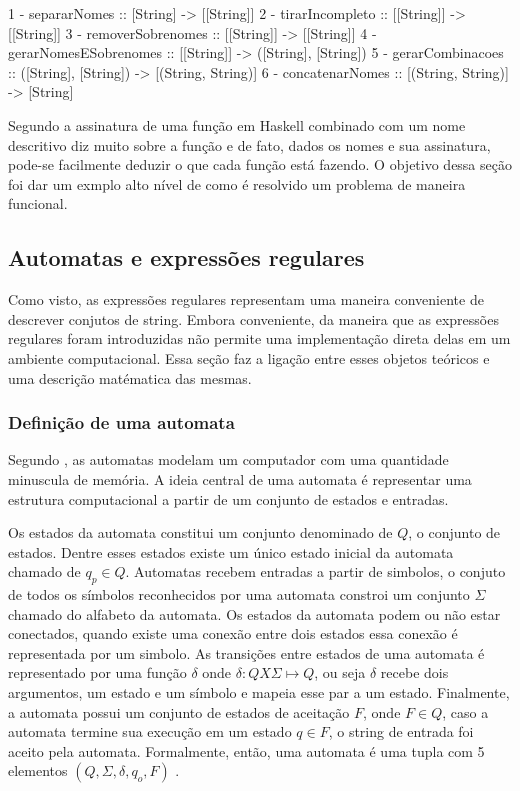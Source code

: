 1 - separarNomes :: [String] -> [[String]]
2 - tirarIncompleto :: [[String]] -> [[String]]
3 - removerSobrenomes :: [[String]] -> [[String]]
4 - gerarNomesESobrenomes :: [[String]] -> ([String], [String])
5 - gerarCombinacoes :: ([String], [String]) -> [(String, String)]
6 - concatenarNomes :: [(String, String)] -> [String]

Segundo \cite{lipovaca} a assinatura de uma função em Haskell combinado com um nome descritivo diz muito sobre a função e de fato, dados os nomes e sua assinatura, pode-se facilmente deduzir o que cada função está fazendo.
O objetivo dessa seção foi dar um exmplo alto nível de como é resolvido um problema de maneira funcional.

\subsection{Automatas e expressões regulares}

Como visto, as expressões regulares representam uma maneira conveniente de descrever conjutos de string.
Embora conveniente, da maneira que as expressões regulares foram introduzidas não permite uma implementação direta delas em um ambiente computacional.
Essa seção faz a ligação entre esses objetos teóricos e uma descrição matématica das mesmas.

\subsubsection{Definição de uma automata}

Segundo \cite{comp}, as automatas modelam um computador com uma quantidade minuscula de memória.
A ideia central de uma automata é representar uma estrutura computacional a partir de um conjunto de estados e entradas.

Os estados da automata constitui um conjunto denominado de $Q$, o conjunto de estados.
Dentre esses estados existe um único estado inicial da automata chamado de $q_p \in Q$.
Automatas recebem entradas a partir de simbolos, o conjuto de todos os símbolos reconhecidos por uma automata constroi um conjunto $\Sigma$ chamado do alfabeto da automata.
Os estados da automata podem ou não estar conectados, quando existe uma conexão entre dois estados essa conexão é representada por um simbolo.
As transições entre estados de uma automata é representado por uma função $\delta$ onde $\delta : Q X \Sigma \mapsto Q$, ou seja $\delta$ recebe dois argumentos, um estado e um símbolo e mapeia esse par a um estado.
Finalmente, a automata possui um conjunto de estados de aceitação $F$, onde $F \in Q$, caso a automata termine sua execução em um estado $q \in F$, o string de entrada foi aceito pela automata.
Formalmente, então, uma automata é uma tupla com 5 elementos $(Q, \Sigma, \delta, q_o, F)$ \cite{comp}.

